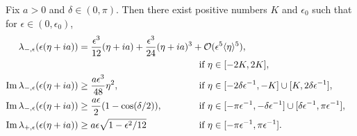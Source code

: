 \begin{lem}\label{linear-frequency}
	Fix \(a> 0\) and \(\delta \in (0,\pi)\). Then there exist positive numbers \(K\) and \(\epsilon_0\) such that for \(\epsilon\in(0,\epsilon_0)\),
	\begin{align*}
		\lambda_{-, \epsilon}(\epsilon(\eta + ia)) &= \frac{\epsilon^3}{12}(\eta + ia) + \frac{\epsilon^3}{24}(\eta + ia)^3 + \mathcal O(\epsilon^5\langle \eta \rangle^5), \\
		 & &&\hspace{-6em}\text{if } \eta\in[-2K, 2K], \\
		\Im \lambda_{-,\epsilon}(\epsilon(\eta + ia)) &\geq \frac{a \epsilon^3}{48} \eta^2, &&\hspace{-6em}\text{if } \eta\in[-2\delta\epsilon^{-1}, -K] \cup [K, 2\delta \epsilon^{-1}], \\
		\Im \lambda_{-,\epsilon}(\epsilon(\eta + ia)) &\geq \frac{a\epsilon}2(1-\cos(\delta / 2)), &&\hspace{-6em}\text{if } \eta\in[-\pi\epsilon^{-1}, - \delta \epsilon^{-1}] \cup [\delta\epsilon^{-1}, \pi\epsilon^{-1}], \\
		\Im \lambda_{+,\epsilon}(\epsilon(\eta + ia)) &\geq a\epsilon\sqrt{1-\epsilon^2/12} &&\hspace{-6em}\text{if } \eta\in [-\pi \epsilon^{-1}, \pi \epsilon^{-1}].
	\end{align*}
\end{lem}

